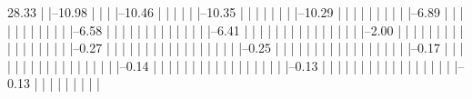     28.33%
            |          
            |--10.98%
            |          |          
            |          |--10.46%
            |          |          |          
            |          |          |--10.35%
            |          |          |          |          
            |          |          |          |--10.29%
            |          |          |          |          |          
            |          |          |          |          |--6.89%
            |          |          |          |          |          |          
            |          |          |          |          |          |--6.58%
            |          |          |          |          |          |          |          
            |          |          |          |          |          |          |--6.41%
            |          |          |          |          |          |          |          |          
            |          |          |          |          |          |          |          |--2.00%
            |          |          |          |          |          |          |          |          |          
            |          |          |          |          |          |          |          |          |--0.27%
            |          |          |          |          |          |          |          |          |          
            |          |          |          |          |          |          |          |          |--0.25%
            |          |          |          |          |          |          |          |          |          
            |          |          |          |          |          |          |          |          |--0.17%
            |          |          |          |          |          |          |          |          |          
            |          |          |          |          |          |          |          |          |--0.14%
            |          |          |          |          |          |          |          |          |          
            |          |          |          |          |          |          |          |          |--0.13%
            |          |          |          |          |          |          |          |          |          
            |          |          |          |          |          |          |          |          |--0.13%
            |          |          |          |          |          |          |          |          |          
